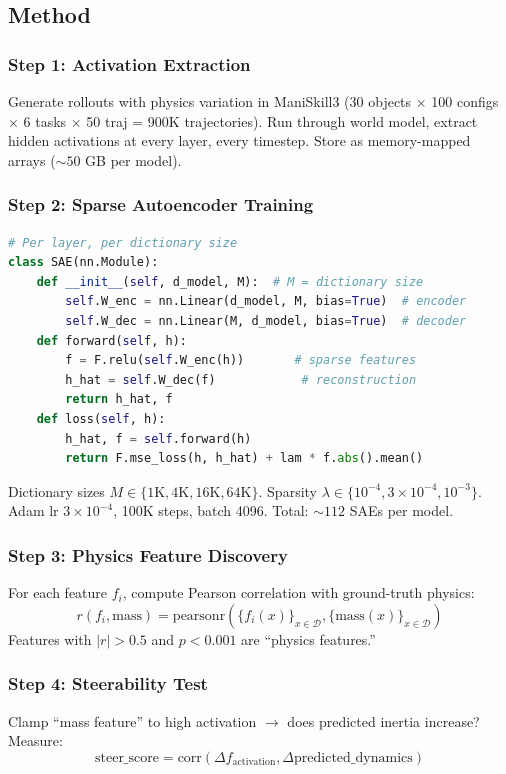 \documentclass[11pt,a4paper]{article}
\begin{document}
\subsection{Method}

\subsubsection{Step 1: Activation Extraction}
Generate rollouts with physics variation in ManiSkill3 (30 objects $\times$ 100 configs $\times$ 6 tasks $\times$ 50 traj = 900K trajectories). Run through world model, extract hidden activations at every layer, every timestep. Store as memory-mapped arrays (${\sim}50$ GB per model).

\subsubsection{Step 2: Sparse Autoencoder Training}
\begin{lstlisting}[language=Python, caption=SAE Architecture]
# Per layer, per dictionary size
class SAE(nn.Module):
    def __init__(self, d_model, M):  # M = dictionary size
        self.W_enc = nn.Linear(d_model, M, bias=True)  # encoder
        self.W_dec = nn.Linear(M, d_model, bias=True)  # decoder
    def forward(self, h):
        f = F.relu(self.W_enc(h))       # sparse features
        h_hat = self.W_dec(f)            # reconstruction
        return h_hat, f
    def loss(self, h):
        h_hat, f = self.forward(h)
        return F.mse_loss(h, h_hat) + lam * f.abs().mean()
\end{lstlisting}

Dictionary sizes $M \in \{1\text{K}, 4\text{K}, 16\text{K}, 64\text{K}\}$. Sparsity $\lambda \in \{10^{-4}, 3{\times}10^{-4}, 10^{-3}\}$. Adam lr $3{\times}10^{-4}$, 100K steps, batch 4096. Total: ${\sim}112$ SAEs per model.

\subsubsection{Step 3: Physics Feature Discovery}
For each feature $f_i$, compute Pearson correlation with ground-truth physics:
\begin{equation}
r(f_i, \text{mass}) = \text{pearsonr}(\{f_i(x)\}_{x \in \mathcal{D}}, \{\text{mass}(x)\}_{x \in \mathcal{D}})
\end{equation}
Features with $|r| > 0.5$ and $p < 0.001$ are ``physics features.''

\subsubsection{Step 4: Steerability Test}
Clamp ``mass feature'' to high activation $\to$ does predicted inertia increase? Measure:
\begin{equation}
\text{steer\_score} = \text{corr}(\Delta f_{\text{activation}}, \Delta \text{predicted\_dynamics})
\end{equation}
\end{document}
